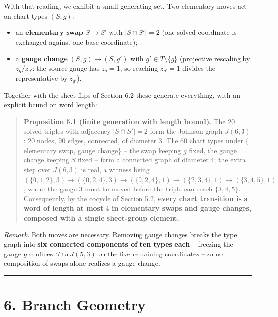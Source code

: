 With that reading, we exhibit a small generating set. Two elementary moves act on chart types \((S, g)\):

\begin{itemize}
\tightlist
\item
  an \textbf{elementary swap} \(S \to S'\) with \(|S \cap S'| = 2\) (one solved coordinate is exchanged against one base coordinate);
\item
  a \textbf{gauge change} \((S, g) \to (S, g')\) with \(g' \in T \setminus \{g\}\) (projective rescaling by \(z_g/z_{g'}\): the source gauge has \(z_g = 1\), so reaching \(z_{g'} = 1\) divides the representative by \(z_{g'}\)).
\end{itemize}

Together with the sheet flips of Section 6.2 these generate everything, with an explicit bound on word length:

\begin{quote}
\textbf{Proposition 5.1 (finite generation with length bound).} The \(20\) solved triples with adjacency \(|S \cap S'| = 2\) form the Johnson graph \(J(6,3)\): \(20\) nodes, \(90\) edges, connected, of diameter \(3\). The \(60\) chart types under \(\{\)elementary swap, gauge change\(\}\) -- the swap keeping \(g\) fixed, the gauge change keeping \(S\) fixed -- form a connected graph of diameter \(4\); the extra step over \(J(6,3)\) is real, a witness being \((\{0,1,2\}, 3) \to (\{0,2,4\}, 3) \to (\{0,2,4\}, 1) \to
(\{2,3,4\}, 1) \to (\{3,4,5\}, 1)\), where the gauge \(3\) must be moved before the triple can reach \(\{3,4,5\}\). Consequently, by the cocycle of Section 5.2, \textbf{every chart transition is a word of length at most \(4\) in elementary swaps and gauge changes, composed with a single sheet-group element.}
\end{quote}

\emph{Remark.} Both moves are necessary. Removing gauge changes breaks the type graph into \textbf{six connected components of ten types each} -- freezing the gauge \(g\) confines \(S\) to \(J(5,3)\) on the five remaining coordinates -- so no composition of swaps alone realizes a gauge change.

\begin{center}\rule{\linewidth}{0.5pt}\end{center}

\section{6. Branch Geometry}\label{branch-geometry}

